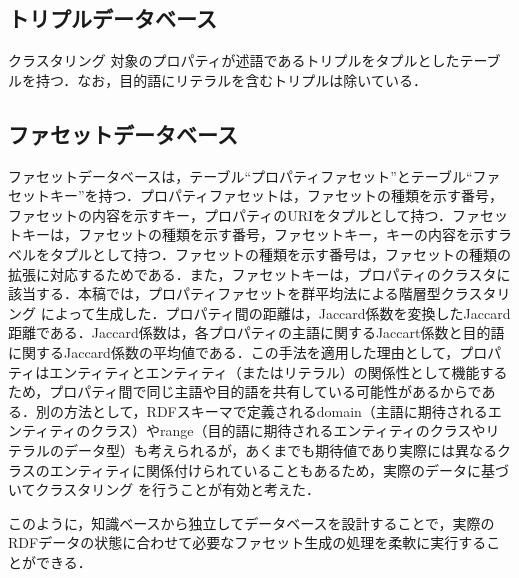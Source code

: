 \subsection{トリプルデータベース}
クラスタリング 対象のプロパティが述語であるトリプルをタプルとしたテーブルを持つ．なお，目的語にリテラルを含むトリプルは除いている．
%
\subsection{ファセットデータベース}
ファセットデータベースは，テーブル``プロパティファセット''とテーブル``ファセットキー''を持つ．プロパティファセットは，ファセットの種類を示す番号，ファセットの内容を示すキー，プロパティのURIをタプルとして持つ．ファセットキーは，ファセットの種類を示す番号，ファセットキー，キーの内容を示すラベルをタプルとして持つ．ファセットの種類を示す番号は，ファセットの種類の拡張に対応するためである．また，ファセットキーは，プロパティのクラスタに該当する．本稿では，プロパティファセットを群平均法による階層型クラスタリング によって生成した．プロパティ間の距離は，Jaccard係数を変換したJaccard距離である．Jaccard係数は，各プロパティの主語に関するJaccart係数と目的語に関するJaccard係数の平均値である．この手法を適用した理由として，プロパティはエンティティとエンティティ（またはリテラル）の関係性として機能するため，プロパティ間で同じ主語や目的語を共有している可能性があるからである．別の方法として，RDFスキーマで定義されるdomain（主語に期待されるエンティティのクラス）やrange（目的語に期待されるエンティティのクラスやリテラルのデータ型）も考えられるが，あくまでも期待値であり実際には異なるクラスのエンティティに関係付けられていることもあるため，実際のデータに基づいてクラスタリング を行うことが有効と考えた．

このように，知識ベースから独立してデータベースを設計することで，実際のRDFデータの状態に合わせて必要なファセット生成の処理を柔軟に実行することができる．